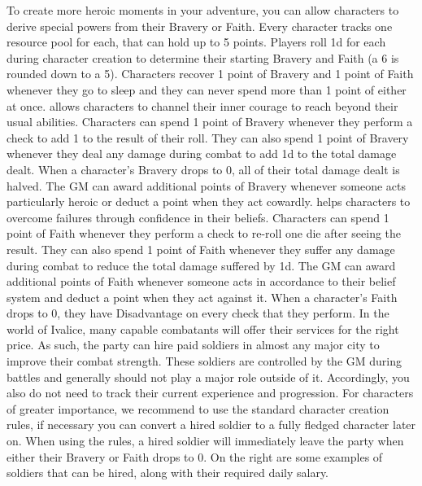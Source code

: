 %
\clearpage
%
To create more heroic moments in your adventure, you can allow characters to derive special powers from their Bravery or Faith.
Every character tracks one resource pool for each, that can hold up to 5 points.
Players roll 1d for each during character creation to determine their starting Bravery and Faith (a 6 is rounded down to a 5).
Characters recover 1 point of Bravery and 1 point of Faith whenever they go to sleep and they can never spend more than 1 point of either at once.
 allows characters to channel their inner courage to reach beyond their usual abilities.
Characters can spend 1 point of Bravery whenever they perform a check to add 1 to the result of their roll.
They can also spend 1 point of Bravery whenever they deal any damage during combat to add 1d to the total damage dealt.
When a character's Bravery drops to 0, all of their total damage dealt is halved.
The GM can award additional points of Bravery whenever someone acts particularly heroic or deduct a point when they act cowardly.
 helps characters to overcome failures through confidence in their beliefs.
Characters can spend 1 point of Faith whenever they perform a check to re-roll one die after seeing the result.
They can also spend 1 point of Faith whenever they suffer any damage during combat to reduce the total damage suffered by 1d.
The GM can award additional points of Faith whenever someone acts in accordance to their belief system and deduct a point when they act against it.
When a character's Faith drops to 0, they have Disadvantage on every check that they perform.
%
\vfill
%
%
\vfill
%
In the world of Ivalice, many capable combatants will offer their services for the right price.
As such, the party can hire paid soldiers in almost any major city to improve their combat strength.
These soldiers are controlled by the GM during battles and generally should not play a major role outside of it.
Accordingly, you also do not need to track their current experience and progression. 
For characters of greater importance, we recommend to use the standard character creation rules, if necessary you
can convert a hired soldier to a fully fledged character later on.
When using the  rules, a hired soldier will immediately leave the party when either their Bravery or Faith drops to 0.
On the right are some examples of soldiers that can be hired, along with their required daily salary.
